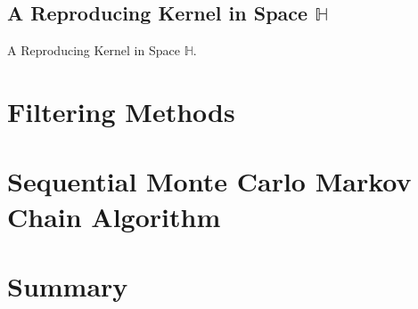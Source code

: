 \subsection{A Reproducing Kernel in Space $\mathbb{H}$}\label{sectionRK}

A Reproducing Kernel in Space $\mathbb{H}$.


\section{Filtering Methods}

\section{Sequential Monte Carlo Markov Chain Algorithm}


\section{Summary}




